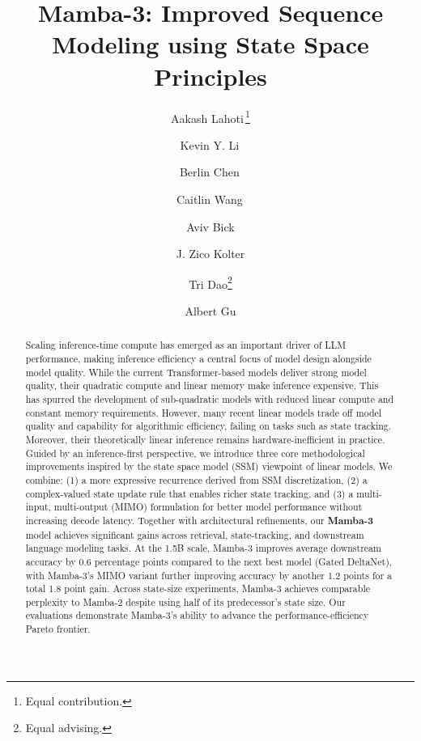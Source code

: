 \documentclass{article}
\title{Mamba-3: Improved Sequence Modeling using State Space Principles}
\author[$^{1}$]{Aakash Lahoti\,\thanks{Equal contribution.}}
\author[$^{1}$]{Kevin Y. Li\,\samethanks[1]}
\author[$^{2}$]{Berlin Chen\,\samethanks[1]}
\author[$^{2}$]{Caitlin Wang\,\samethanks[1]}
\author[$^{1}$]{Aviv Bick}
\author[$^{1}$]{J. Zico Kolter}
\author[$^{23}$]{\authorcr Tri Dao\thanks{Equal advising.}}
\author[$^{14}$]{Albert Gu\samethanks[2]}
\affil[ ]{\normalsize $^1$Carnegie Mellon University \quad $^2$Princeton University \quad $^3$Together AI \quad $^4$Cartesia AI}
\affil[ ]{{\texttt{\{alahoti, kyl2, abick, zkolter, agu\}@cs.cmu.edu} \quad \texttt{\{bc2188, caitlinwang, tridao\}@princeton.edu}}}
\date{}
\theoremstyle{plain}
\theoremstyle{definition}
\theoremstyle{remark}
\begin{document}
\maketitle

\begin{abstract}
\noindent 
Scaling inference-time compute has emerged as an important driver of LLM performance, making inference efficiency a central focus of model design alongside model quality.
While the current Transformer-based models deliver strong model quality, their quadratic compute and linear memory make inference expensive.
This has spurred the development of sub-quadratic models with reduced linear compute and constant memory requirements.
However, many recent linear models trade off model quality and capability for algorithmic efficiency, failing on tasks such as state tracking. Moreover, their theoretically linear inference remains hardware-inefficient in practice.
Guided by an inference-first perspective, we introduce three core methodological improvements inspired by the state space model (SSM) viewpoint of linear models.
We combine: (1) a more expressive recurrence derived from SSM discretization, (2) a complex-valued state update rule that enables richer state tracking, and (3) a multi-input, multi-output (MIMO) formulation for better model performance without increasing decode latency. 
Together with architectural refinements, our \textbf{Mamba-3} model achieves significant gains across retrieval, state-tracking, and downstream language modeling tasks.
At the 1.5B scale, Mamba-3 improves average downstream accuracy by 0.6 percentage points compared to the next best model (Gated DeltaNet), with Mamba-3's MIMO variant further improving accuracy by another 1.2 points for a total 1.8 point gain.
Across state-size experiments, Mamba-3 achieves comparable perplexity to Mamba-2 despite using half of its predecessor's state size.
Our evaluations demonstrate Mamba-3's ability to advance the performance-efficiency Pareto frontier.
\end{abstract}
\end{document}
